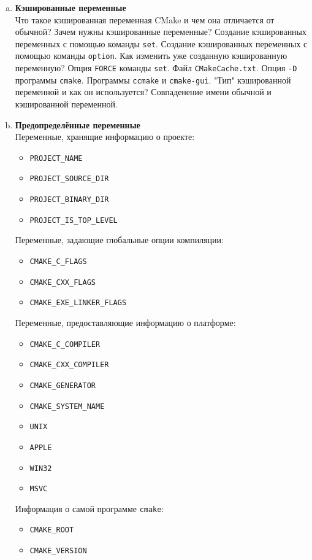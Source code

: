\documentclass{article}
\begin{document}
\begin{enumerate}
\begin{enumerate}[a.]
\item \textbf{Кэшированные переменные}\\
Что такое кэшированная переменная CMake и чем она отличается от обычной? Зачем нужны кэшированные переменные? Создание кэшированных переменных с помощью команды \texttt{set}. Создание кэшированных переменных с помощью команды \texttt{option}. Как изменить уже созданную кэшированную переменную? Опция \texttt{FORCE} команды \texttt{set}. Файл \texttt{CMakeCache.txt}. Опция \texttt{-D} программы \texttt{cmake}. Программы \texttt{ccmake} и \texttt{cmake-gui}. "Тип"{} кэшированной переменной и как он используется? Совпаденение имени обычной и кэшированной переменной.


\item \textbf{Предопределённые переменные}\\
Переменные, хранящие информацию о проекте:
\begin{itemize}
\item \texttt{PROJECT\_NAME}
\item \texttt{PROJECT\_SOURCE\_DIR}
\item \texttt{PROJECT\_BINARY\_DIR}
\item \texttt{PROJECT\_IS\_TOP\_LEVEL}
\end{itemize}

Переменные, задающие глобальные опции компиляции:
\begin{itemize}
\item \texttt{CMAKE\_C\_FLAGS}
\item \texttt{CMAKE\_CXX\_FLAGS}
\item \texttt{CMAKE\_EXE\_LINKER\_FLAGS}
\end{itemize}

Переменные, предоставляющие информацию о платформе:
\begin{multicols}{2}
\begin{itemize}
\item \texttt{CMAKE\_C\_COMPILER}
\item \texttt{CMAKE\_CXX\_COMPILER}
\item \texttt{CMAKE\_GENERATOR}
\item \texttt{CMAKE\_SYSTEM\_NAME}
\item \texttt{UNIX}
\item \texttt{APPLE}
\item \texttt{WIN32}
\item \texttt{MSVC}
\end{itemize}
\end{multicols}
Информация о самой программе \texttt{cmake}:
\begin{itemize}
\item \texttt{CMAKE\_ROOT}
\item \texttt{CMAKE\_VERSION}
\end{itemize}


\end{enumerate}
\end{enumerate}
\end{document}
